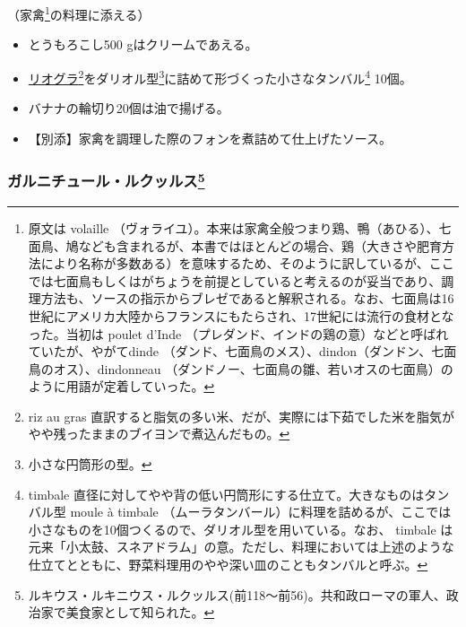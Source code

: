 \begin{recette}


（家禽\footnote{原文は volaille
  （ヴォライユ）。本来は家禽全般つまり鶏、鴨（あひる）、七面鳥、鳩なども含まれるが、本書ではほとんどの場合、鶏（大きさや肥育方法により名称が多数ある）を意味するため、そのように訳しているが、ここでは七面鳥もしくはがちょうを前提としていると考えるのが妥当であり、調理方法も、ソースの指示からブレゼであると解釈される。なお、七面鳥は16世紀にアメリカ大陸からフランスにもたらされ、17世紀には流行の食材となった。当初は
  poulet d'Inde
  （プレダンド、インドの鶏の意）などと呼ばれていたが、やがてdinde
  （ダンド、七面鳥のメス）、dindon（ダンドン、七面鳥のオス）、dindonneau
  （ダンドノー、七面鳥の雛、若いオスの七面鳥）のように用語が定着していった。}の料理に添える）

\begin{itemize}
\item
  とうもろこし500 gはクリームであえる。
\item
  \protect\hyperlink{riz-au-gras}{リオグラ}\footnote{riz au gras
    直訳すると脂気の多い米、だが、実際には下茹でした米を脂気がやや残ったままのブイヨンで煮込んだもの。}をダリオル型\footnote{小さな円筒形の型。}に詰めて形づくった小さなタンバル\footnote{timbale
    直径に対してやや背の低い円筒形にする仕立て。大きなものはタンバル型
    moule à timbale
    （ムーラタンバール）に料理を詰めるが、ここでは小さなものを10個つくるので、ダリオル型を用いている。なお、
    timbale
    は元来「小太鼓、スネアドラム」の意。ただし、料理においては上述のような仕立てとともに、野菜料理用のやや深い皿のこともタンバルと呼ぶ。}
  10個。
\item
  バナナの輪切り20個は油で揚げる。
\item
  【別添】家禽を調理した際のフォンを煮詰めて仕上げたソース。
\end{itemize}

\atoaki{}

\hypertarget{garniture-lucullus}{%
\subsubsection[ガルニチュール・ルクッルス]{\texorpdfstring{ガルニチュール・ルクッルス\footnote{ルキウス・ルキニウス・ルクッルス(前118〜前56)。共和政ローマの軍人、政治家で美食家として知られた。}}{ガルニチュール・ルクッルス}}\label{garniture-lucullus}}


\end{recette}
